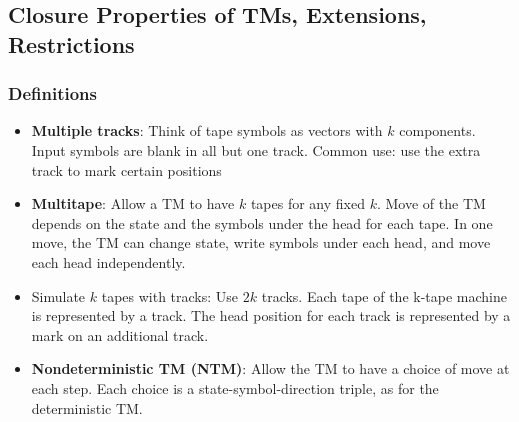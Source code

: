 \subsection{\color{ForestGreen}Closure Properties of TMs, Extensions, Restrictions}
\subsubsection{Definitions}
\begin{itemize}
    \item \textbf{Multiple tracks}: Think of tape symbols as vectors with $k$ components. Input symbols are blank in all but one track. Common use: use the extra track to mark certain positions
    \item \textbf{Multitape}: Allow a TM to have $k$ tapes for any fixed $k$. Move of the TM depends on the state and the symbols under the head for each tape. In one move, the TM can change state, write symbols under each head, and move each head independently.
    \item Simulate $k$ tapes with tracks: Use $2k$ tracks. Each tape of the k-tape machine is represented by a track. The head position for each track is represented by a mark on an additional track.
    \item \textbf{Nondeterministic TM (NTM)}: Allow the TM to have a choice of move at each step. Each choice is a state-symbol-direction triple, as for the deterministic TM.
\end{itemize}

